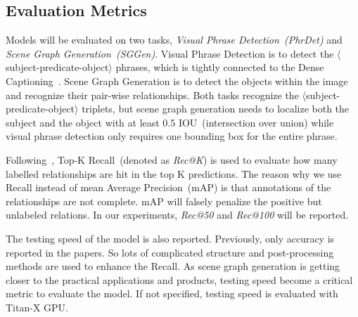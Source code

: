 \documentclass[runningheads]{llncs}
\begin{document}
\subsection{Evaluation Metrics}
Models will be evaluated on two tasks, \emph{Visual Phrase Detection~(PhrDet)} and \emph{Scene Graph Generation~(SGGen)}. Visual Phrase Detection is to detect the $\langle$subject-predicate-object$\rangle$ phrases, which is tightly connected to the Dense Captioning~\cite{densecap}. Scene Graph Generation is to detect the objects within the image and recognize their pair-wise relationships. Both tasks recognize the $\langle$subject-predicate-object$\rangle$ triplets, but scene graph generation needs to localize both the subject and the object with at least 0.5 IOU~(intersection over union) while visual phrase detection only requires one bounding box for the entire phrase.  

Following~\cite{visual_relationship}, Top-K Recall~(denoted as \emph{Rec@K}) is used to evaluate how many labelled relationships are hit in the top K predictions. The reason why we use Recall instead of mean Average Precision~(mAP) is that annotations of the relationships are not complete. mAP will falsely penalize the positive but unlabeled relations. In our experiments, \emph{Rec@50} and \emph{Rec@100} will be reported. 


The testing speed of the model is also reported. Previously, only accuracy is reported in the papers. So lots of complicated structure and post-processing methods are used to enhance the Recall. 
As scene graph generation is getting closer to the practical applications and products, testing speed become a critical metric to evaluate the model. If not specified, testing speed is evaluated with Titan-X GPU.
\end{document}
